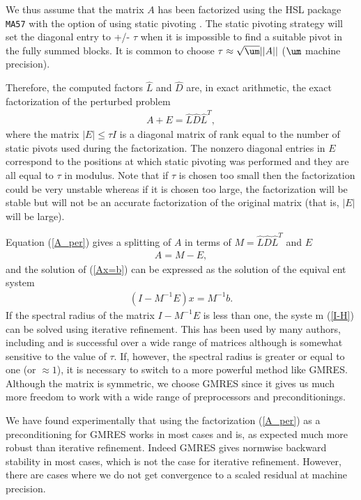 \documentclass{report}
\begin{document}
We thus assume that the matrix $A$ has been factorized using the HSL package
{\tt MA57}
with the option of using static pivoting \cite{dupr:05}. The static pivoting
strategy will set the diagonal entry to +/- $\tau$
when it is impossible to find a suitable pivot in the fully summed blocks.
It is common to choose $\tau \approx \sqrt{\um} ||A||$ ($\um$ machine
precision).

Therefore, the computed factors $\hat{L}$ and $\hat{D}$ are, in exact
arithmetic, the exact factorization
of the perturbed problem
\begin{eqnarray}\label{A_per}
A + E = \hat{L} \hat{D} \hat{L}^T,
\end{eqnarray}
where the matrix $|E| \le \tau I$ is a diagonal matrix of rank equal to the
number of static pivots used during the factorization. The nonzero diagonal
entries in $E$
correspond to the positions at which static pivoting was performed and they
are all equal to $\tau$ in modulus. Note that if $\tau$ is chosen too small
then the
factorization could be very unstable whereas if it is chosen too large, the
factorization will be stable but will not be an accurate factorization of the
original matrix (that is, $|E|$ will be large).

Equation (\ref{A_per}) gives a splitting of $A$ in terms of $M = \hat{L} \hat{D}
\hat{L}^T$ and $E$
\begin{eqnarray}\label{A_split}
A = M - E,
\end{eqnarray}
and the solution of (\ref{Ax=b}) can be expressed as the solution of the equival
ent system
\begin{eqnarray}\label{I-H}
(I - M^{-1} E) x = M^{-1}b.
\end{eqnarray}
If the spectral radius of the matrix $I - M^{-1} E $ is less than one, the syste
m (\ref{I-H}) can be solved using
iterative refinement. This has been used by many authors, including \cite{dupr:0
5} and is successful over a wide range of matrices although is somewhat
sensitive to the value of $\tau$. If, however, the
spectral radius is
greater or equal to one (or $\approx 1$), it is necessary to switch to a
more powerful
method like GMRES. Although the matrix is symmetric, we choose
GMRES since it gives us much more freedom to work with a wide range of
preprocessors and preconditionings.

We have found experimentally that using the factorization (\ref{A_per}) as
a preconditioning for GMRES works in most cases and is, as expected much
more robust than iterative refinement. Indeed GMRES gives
normwise backward stability in most cases, which is
not the case
for iterative refinement. However, there are cases where we
do not get convergence to a scaled residual at machine precision.
\end{document}
